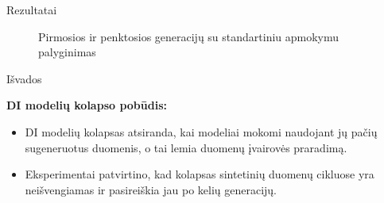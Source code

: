 \documentclass{beamer}
\begin{document}
\begin{frame}{Rezultatai}
    \begin{figure}[!htbp]
        \hfill
        \caption{Pirmosios ir penktosios generacijų su standartiniu apmokymu palyginimas}
        \label{fig:comparison_generations}
    \end{figure}
\end{frame}



\begin{frame}{Išvados}
    \item \textbf{DI modelių kolapso pobūdis:}
    \begin{itemize}
        \item DI modelių kolapsas atsiranda, kai modeliai mokomi naudojant jų pačių sugeneruotus duomenis, o tai lemia duomenų įvairovės praradimą.
        \item Eksperimentai patvirtino, kad kolapsas sintetinių duomenų cikluose yra neišvengiamas ir pasireiškia jau po kelių generacijų.
    \end{itemize}
\end{frame}
\end{document}
